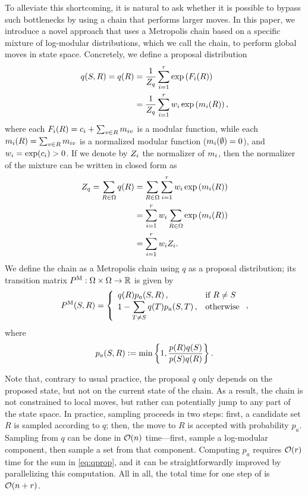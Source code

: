 To alleviate this shortcoming, it is natural to ask whether it is possible to bypass such bottlenecks by using a chain that performs larger moves.
In this paper, we introduce a novel approach that uses a Metropolis chain based on a specific mixture of log-modular distributions, which we call the \Ms{} chain, to perform global moves in state space.
Concretely, we define a proposal distribution
\begin{align} \label{eq:qprop}
  q(S, R) = q(R) &= \frac{1}{Z_q} \sum_{i = 1}^{r} \exp\left( F_i(R) \right) \nonumber\\
                 &= \frac{1}{Z_q} \sum_{i = 1}^{r} w_i \exp\left(m_i(R) \right),
\end{align}
where each $F_i(R) = c_i + \sum_{v \in R}m_{iv}$ is a modular function, while each $m_i(R) = \sum_{v \in R}m_{iv}$ is a normalized modular function ($m_i(\emptyset) = 0$), and $w_i = \exp(c_i) > 0$.
If we denote by $Z_i$ the normalizer of $m_i$, then the normalizer of the mixture can be written in closed form as
\begin{align*}
  Z_q = \sum_{R \in \Omega}q(R) &= \sum_{R \in \Omega}\sum_{i = 1}^{r} w_i \exp\left(m_i(R) \right)\\
                                &= \sum_{i = 1}^{r} w_i \sum_{R \in \Omega} \exp\left(m_i(R) \right)\\
                                &= \sum_{i = 1}^r w_i Z_i.
\end{align*}
We define the \Ms{} chain as a Metropolis chain using $q$ as a proposal distribution; its transition matrix $P^{\mathrm{M}} : \Omega \times \Omega \to \mathbb{R}$ is given by
\begin{align*}
  P^{\mathrm{M}}(S, R) = \left\{ \begin{array}{ll} q(R) p_a(S, R)\,,& \mbox{if } R \neq S \\ 1 - \displaystyle\sum_{T \neq S} q(T) p_a(S, T)\,,& \mbox{otherwise} \end{array} \right.,
\end{align*}
where
\begin{align*}
  p_{a}(S, R) \vcentcolon= \min\left\{1, \displaystyle\frac{p(R)q(S)}{p(S)q(R)}\right\}.
\end{align*}

Note that, contrary to usual practice, the proposal $q$ only depends on the proposed state, but not on the current state of the chain.
As a result, the chain is not constrained to local moves, but rather can potentially jump to any part of the state space.
In practice, \Ms{} sampling proceeds in two steps: first, a candidate set $R$ is sampled according to $q$; then, the move to $R$ is accepted with probability $p_a$.
Sampling from $q$ can be done in $\mathcal{O}(n)$ time---first, sample a log-modular component, then sample a set from that component.
Computing $p_a$ requires $\mathcal{O}(r)$ time for the sum in \eqref{eq:qprop}, and it can be straightforwardly improved by parallelizing this computation.
All in all, the total time for one step of \Ms{} is $\mathcal{O}(n + r)$.

